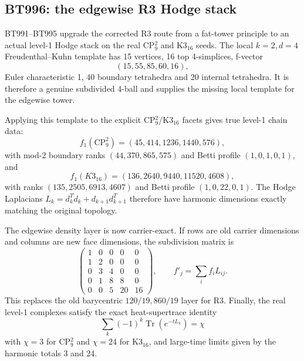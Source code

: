 \subsection*{BT996: the edgewise R3 Hodge stack}

BT991--BT995 upgrade the corrected R3 route from a fat-tower principle to an
actual level-1 Hodge stack on the real CP\(^2_9\) and K3\(_{16}\) seeds.  The
local \(k=2,d=4\) Freudenthal--Kuhn template has 15 vertices, 16 top
4-simplices, f-vector
\[
  (15,55,85,60,16),
\]
Euler characteristic 1, 40 boundary tetrahedra and 20 internal tetrahedra.  It
is therefore a genuine subdivided 4-ball and supplies the missing local template
for the edgewise tower.

Applying this template to the explicit CP\(^2_9\)/K3\(_{16}\) facets gives true
level-1 chain data:
\[
  f_1(\mathrm{CP}^2_9)=(45,414,1236,1440,576),
\]
with mod-2 boundary ranks \((44,370,865,575)\) and Betti profile
\((1,0,1,0,1)\), and
\[
  f_1(K3_{16})=(136,2640,9440,11520,4608),
\]
with ranks \((135,2505,6913,4607)\) and Betti profile
\((1,0,22,0,1)\).  The Hodge Laplacians
\(L_k=d_k^Td_k+d_{k+1}d_{k+1}^T\) therefore have harmonic dimensions exactly
matching the original topology.

The edgewise density layer is now carrier-exact.  If rows are old carrier
dimensions and columns are new face dimensions, the subdivision matrix is
\[
\begin{pmatrix}
1&0&0&0&0\\
1&2&0&0&0\\
0&3&4&0&0\\
0&1&8&8&0\\
0&0&5&20&16
\end{pmatrix},
\qquad
f'_{j}=\sum_i f_i L_{ij}.
\]
This replaces the old barycentric \(120/19,860/19\) layer for R3.  Finally, the
real level-1 complexes satisfy the exact heat-supertrace identity
\[
  \sum_k(-1)^k\operatorname{Tr}(e^{-tL_k})=\chi
\]
with \(\chi=3\) for CP\(^2_9\) and \(\chi=24\) for K3\(_{16}\), and large-time
limits given by the harmonic totals 3 and 24.
